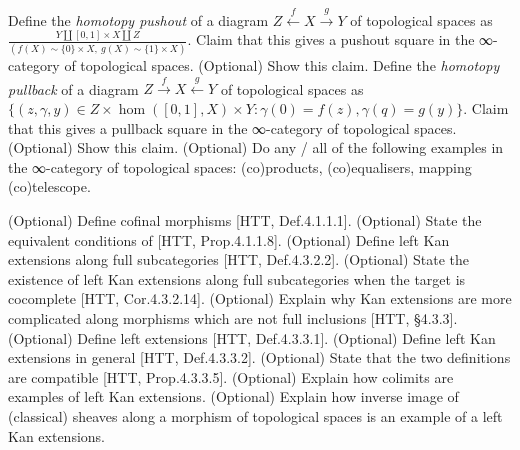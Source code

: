 \documentclass[a4paper]{amsart}
\numberwithin{figure}{section}
\theoremstyle{theorem}
\theoremstyle{definition}
\newcommand{\NN}{\mathbb{N}}
\newcommand{\Top}{\mathrm{Top}}
\begin{document}
Define the \emph{homotopy pushout} of a diagram $Z \stackrel{f}{\leftarrow} X \stackrel{g}{\to} Y$  of topological spaces as $ \frac{Y \amalg [0,1]\times X \amalg Z}{(f(X) \sim \{0\} \times X, \ g(X) \sim \{1\} \times X)}$. %
Claim that this gives a pushout square in the ∞-category of topological spaces. %
(Optional) Show this claim. %
Define the \emph{homotopy pullback} of a diagram $Z \stackrel{f}{\rightarrow} X \stackrel{g}{\leftarrow} Y$  of topological spaces as $\{( z, \gamma, y) \in Z \times \hom([0,1], X) \times Y : \gamma(0) = f(z), \gamma(q) = g(y) \}$. %
Claim that this gives a pullback square in the ∞-category of topological spaces. %
(Optional) Show this claim. %
(Optional) Do any / all of the following examples in the ∞-category of topological spaces: (co)products, (co)equalisers, mapping (co)telescope. %

(Optional) Define cofinal morphisms [HTT, Def.4.1.1.1]. %
(Optional) State the equivalent conditions of [HTT, Prop.4.1.1.8]. %
(Optional) Define left Kan extensions along full subcategories [HTT, Def.4.3.2.2]. %
(Optional) State the existence of left Kan extensions along full subcategories when the target is cocomplete [HTT, Cor.4.3.2.14].
(Optional) Explain why Kan extensions are more complicated along morphisms which are not full inclusions [HTT, §4.3.3]. %
(Optional) Define left extensions [HTT, Def.4.3.3.1]. %
(Optional) Define left Kan extensions in general [HTT, Def.4.3.3.2]. %
(Optional) State that the two definitions are compatible [HTT, Prop.4.3.3.5]. %
(Optional) Explain how colimits are examples of left Kan extensions. %
(Optional) Explain how inverse image of (classical) sheaves along a morphism of topological spaces is an example of a left Kan extensions. %




\end{document}
